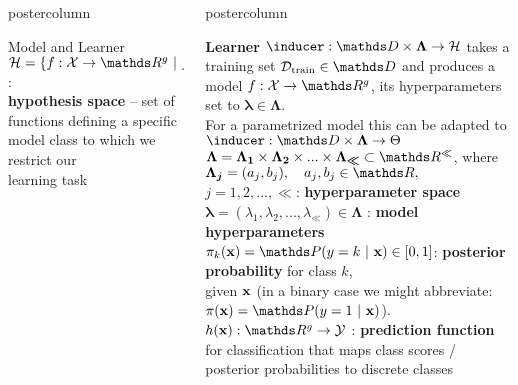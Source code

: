 \documentclass{beamer}
\newlength{\columnheight} %
\begin{document}
\begin{frame}[fragile]{}
\begin{columns}
\begin{column}{.31\textwidth}
\begin{beamercolorbox}[center]{postercolumn}
\begin{minipage}{.98\textwidth}
{\begin{myblock}{Model and Learner}
$\Hspace = \{f : \Xspace \rightarrow \R^g ~|~ f \text{ belongs to a certain functional family}\}$ : \\ \textbf{hypothesis space} -- set of functions defining a specific model class to which we restrict our \\
learning task 					
\end{myblock}\vfill
				}
			\end{minipage}
		\end{beamercolorbox}
	\end{column}
	\begin{column}{.31\textwidth}
		\begin{beamercolorbox}[center]{postercolumn}
			\begin{minipage}{.98\textwidth}
				\parbox[t][\columnheight]{\textwidth}{
\begin{myblock}{} \vspace{-4ex}
\textbf{Learner }$\inducer: \preimageInducerShort \rightarrow \Hspace$  takes a training set  $\Dtrain \in \allDatasets$  and produces a model $f : \Xspace \rightarrow \R^g$, its hyperparameters set to $\bm{\lambda} \in \bm{\Lambda}$.\\
For a parametrized model this can be adapted to $\inducer: \preimageInducerShort \rightarrow \Theta$ \\

$\bm{\Lambda} = \bm{\Lambda_1} \times \bm{\Lambda_2} \times ... \times \bm{\Lambda_{\ll}} \subset \R^{\ll}$, where $\bm{\Lambda_j} = (a_j, b_j), \quad a_j, b_j \in \R,$ \\$j = 1, 2, ... , \ll$: \textbf{hyperparameter space} \\

$\bm{\lambda} = (\lambda_1, \lambda_2, ..., \lambda_{\ll}) \in \bm{\Lambda}$ : \textbf{model hyperparameters} \\

$\pikx = \postk \in [0, 1]$: \textbf{posterior probability} for class $k$, \\ given $\mathbf{x}$ (in a binary case we might abbreviate: $\pix = \post$). \\

$\hx: \R^g \rightarrow \Yspace$ : \textbf{prediction function} for classification that maps class scores / posterior probabilities to discrete classes \\


\end{myblock}}
\end{minipage}
\end{beamercolorbox}
\end{column}
\end{columns}
\end{frame}
\end{document}
